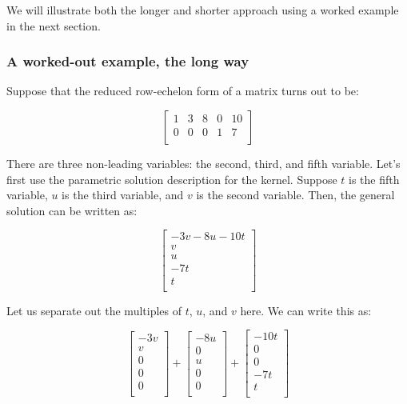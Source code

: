 \documentclass[10pt]{amsart}
\begin{document}
We will illustrate both the longer and shorter approach using a worked
example in the next section.

\subsubsection{A worked-out example, the long way}

Suppose that the reduced row-echelon form of a matrix turns out to be:

$$\left[\begin{matrix} 1 & 3 & 8 & 0 & 10 \\ 0 & 0 & 0 & 1 & 7 \\\end{matrix}\right]$$

There are three non-leading variables: the second, third, and fifth
variable. Let's first use the parametric solution description for the
kernel. Suppose $t$ is the fifth variable, $u$ is the third variable,
and $v$ is the second variable. Then, the general solution can be written as:

$$\left[\begin{matrix} -3v - 8u - 10t \\ v \\ u \\ -7t \\ t \\\end{matrix}\right]$$

Let us separate out the multiples of $t$, $u$, and $v$ here. We can write this as:

$$\left[\begin{matrix} -3v \\ v \\ 0 \\ 0 \\ 0 \\\end{matrix}\right] + \left[\begin{matrix} -8u \\ 0 \\ u \\ 0 \\ 0 \\\end{matrix}\right] + \left[\begin{matrix} -10t \\ 0 \\ 0 \\ -7t \\ t \\\end{matrix}\right]$$
\end{document}
